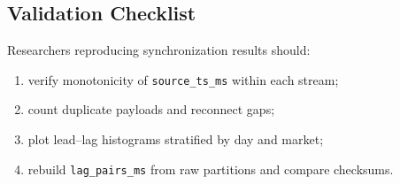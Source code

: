 \FloatBarrier
\begin{samepage}
\subsection{Validation Checklist}

Researchers reproducing synchronization results should:
\begin{enumerate}
  \item verify monotonicity of \texttt{source\_ts\_ms} within each stream;
  \item count duplicate payloads and reconnect gaps;
  \item plot lead--lag histograms stratified by day and market;
  \item rebuild \texttt{lag\_pairs\_ms} from raw partitions and compare checksums.
\end{enumerate}
\end{samepage}

